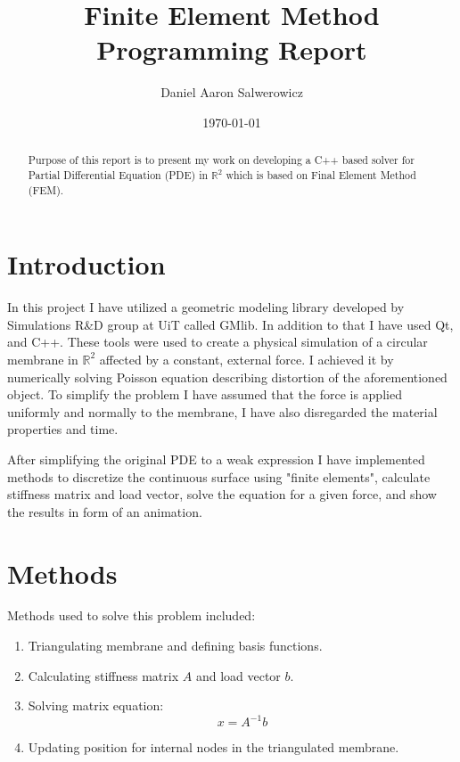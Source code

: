 \documentclass[a4,10pt]{article}
\title{Finite Element Method Programming Report}
\author{Daniel Aaron Salwerowicz}
\date{\today}
\begin{document}
  
\maketitle

\begin{abstract}
  Purpose of this report is to present my work on developing a C++ based solver for Partial Differential Equation (PDE) in $\mathbb{R}^2$ which is based on Final Element Method (FEM). 
\end{abstract}


\section{Introduction}
In this project I have utilized a geometric modeling library developed by Simulations R\&D group at UiT called GMlib. In addition to that I have used Qt, and C++. These tools were used to create a physical simulation of a circular membrane in $\mathbb{R}^2$ affected by a constant, external force. I achieved it by numerically solving Poisson equation describing distortion of the aforementioned object. To simplify the problem I have assumed that the force is applied uniformly and normally to the membrane, I have also disregarded the material properties and time.

After simplifying the original PDE to a weak expression I have implemented methods to discretize the continuous surface using "finite elements", calculate stiffness matrix and load vector, solve the equation for a given force, and show the results in form of an animation.

\section{Methods}
Methods used to solve this problem included:
\begin{enumerate}
  \item Triangulating membrane and defining basis functions.
  \item Calculating stiffness matrix $A$ and load vector $b$.
  \item Solving matrix equation:
  \begin{equation} \label{MatrixEquation}
  x=A^{-1}b
  \end{equation}
  \item Updating position for internal nodes in the triangulated membrane.   
\end{enumerate}
\end{document}
